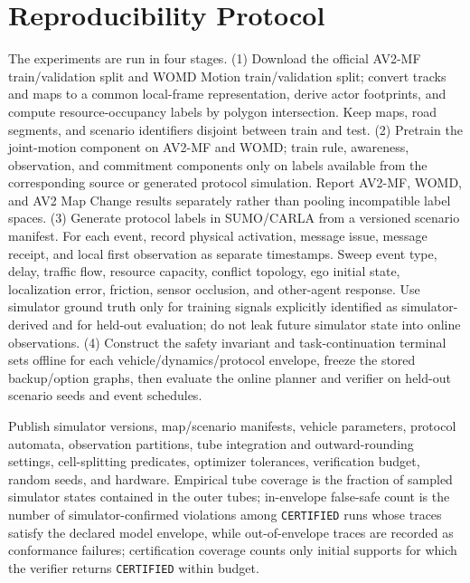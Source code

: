 \documentclass[letterpaper]{article} %
\begin{document}
\section{Reproducibility Protocol}
\label{app:reproducibility}
The experiments are run in four stages. (1) Download the official AV2-MF train/validation split and WOMD Motion train/validation split; convert tracks and maps to a common local-frame representation, derive actor footprints, and compute resource-occupancy labels by polygon intersection. Keep maps, road segments, and scenario identifiers disjoint between train and test. (2) Pretrain the joint-motion component on AV2-MF and WOMD; train rule, awareness, observation, and commitment components only on labels available from the corresponding source or generated protocol simulation. Report AV2-MF, WOMD, and AV2 Map Change results separately rather than pooling incompatible label spaces. (3) Generate protocol labels in SUMO/CARLA from a versioned scenario manifest. For each event, record physical activation, message issue, message receipt, and local first observation as separate timestamps. Sweep event type, delay, traffic flow, resource capacity, conflict topology, ego initial state, localization error, friction, sensor occlusion, and other-agent response. Use simulator ground truth only for training signals explicitly identified as simulator-derived and for held-out evaluation; do not leak future simulator state into online observations. (4) Construct the safety invariant and task-continuation terminal sets offline for each vehicle/dynamics/protocol envelope, freeze the stored backup/option graphs, then evaluate the online planner and verifier on held-out scenario seeds and event schedules.

Publish simulator versions, map/scenario manifests, vehicle parameters, protocol automata, observation partitions, tube integration and outward-rounding settings, cell-splitting predicates, optimizer tolerances, verification budget, random seeds, and hardware. Empirical tube coverage is the fraction of sampled simulator states contained in the outer tubes; in-envelope false-safe count is the number of simulator-confirmed violations among \texttt{CERTIFIED} runs whose traces satisfy the declared model envelope, while out-of-envelope traces are recorded as conformance failures; certification coverage counts only initial supports for which the verifier returns \texttt{CERTIFIED} within budget.


\end{document}
